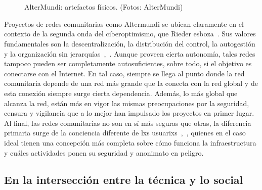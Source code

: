 \begin{figure}[h]
\centering
{} \quad
{} \\
 \quad
{} \\
 \quad
{}
\caption[A number of pictures.]{AlterMundi: artefactos físicos. (Fotos: AlterMundi)} %
\label{fig:artifacts}
\end{figure}

Proyectos de redes comunitarias como Altermundi se ubican claramente en el contexto de la segunda onda del ciberoptimismo, que Rieder esboza~\autocite{Rieder2012}.
Sus valores fundamentales son la descentralización, la distribución del control, la autogestión y la organización sin jerarquías~\autocite{FiTre2015},~\autocite{Piccoli2015}.
Aunque proveen cierta autonomía, tales redes tampoco pueden ser completamente autosuficientes, sobre todo, si el objetivo es conectarse con el Internet.
En tal caso, siempre se llega al punto donde la red comunitaria depende de una red más grande que la conecta con la red global y de esta conexión siempre surge cierta dependencia.
Además, lo más global que alcanza la red, están más en vigor las mismas preocupaciones por la seguridad, censura y vigilancia que a lo mejor han impulsado los proyectos en primer lugar.
Al final, las redes comunitarias no son en sí más seguras que otras, la diferencia primaria surge de la conciencia diferente de lxs usuarixs~\autocite{Piccoli2015},~\autocite{FiTre2015}, quienes en el caso ideal tienen una concepción más completa sobre cómo funciona la infraestructura y cuáles actividades ponen su seguridad y anonimato en peligro.


\subsection{En la intersección entre la técnica y lo social}

